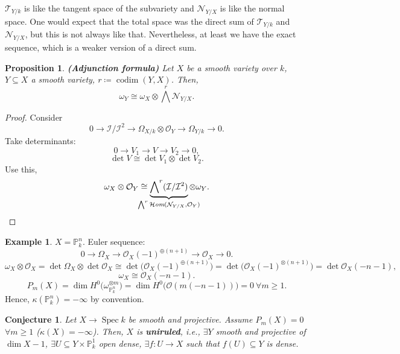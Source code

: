 \documentclass[12pt]{article}
\DeclareMathOperator{\Spec}{Spec}
\DeclareMathOperator{\shHom}{\mathcal H\textit{om}}
\DeclareMathOperator{\codim}{codim}
\newtheorem*{proposition}{Proposition}
\newtheorem*{conjecture}{Conjecture}
\theoremstyle{definition}
\newtheorem*{example}{Example}
\begin{document}
$\mathcal T_{Y/k}$ is like the tangent space of the subvariety and $\mathcal N_{Y/X}$ is like the normal space. One would expect that the total space was the direct sum of $\mathcal T_{Y/k}$ and $\mathcal N_{Y/X}$, but this is not always like that. Nevertheless, at least we have the exact sequence, which is a weaker version of a direct sum.

\begin{proposition}
\emph{\textbf{(Adjunction formula)}} Let $X$ be a smooth variety over $k$, $Y\subseteq X$ a smooth variety, $r\coloneqq\codim(Y,X)$. Then,
\[\omega_Y\cong\omega_X\otimes{\bigwedge}^r\mathcal N_{Y/X}.\]
\end{proposition}

\begin{proof}
Consider
\[0\longrightarrow\mathcal I/\mathcal I^2\longrightarrow\Omega_{X/k}\otimes\mathcal O_Y\longrightarrow\Omega_{Y/k}\longrightarrow0.\]
Take determinants:
\[0\longrightarrow V_1\longrightarrow V\longrightarrow V_2\longrightarrow0,\]
\[\det V\cong\det V_1\otimes\det V_2.\]
Use this,
\[\omega_X\otimes\mathcal O_Y\cong\underbrace{{\bigwedge}^r(\mathcal I/\mathcal I^2)}_{\mathclap{{\bigwedge}^r\shHom(\mathcal N_{Y/X},\mathcal O_Y)}}\otimes\omega_Y.\]
\end{proof}

\begin{example}
$X=\mathbb P_k^n$. Euler sequence:
\[0\longrightarrow\Omega_X\longrightarrow\mathcal O_X(-1)^{\oplus(n+1)}\longrightarrow\mathcal O_X\longrightarrow0.\]
\[\omega_X\otimes\mathcal O_X=\det\Omega_X\otimes\det\mathcal O_X\cong\det\big(\mathcal O_X(-1)^{\oplus(n+1)}\big)=\det\big(\mathcal O_X(-1)^{\otimes(n+1)}\big)=\det\mathcal O_X(-n-1),\]
\[\omega_X\cong\mathcal O_X(-n-1).\]
\[P_m(X)=\dim H^0\big(\omega_{\mathbb P_k^n}^{\otimes m}\big)=\dim H^0\big(\mathcal O(m(-n-1))\big)=0\ \forall m\geq1.\]
Hence, $\kappa(\mathbb P_k^n)=-\infty$ by convention.
\end{example}

\begin{conjecture}
Let $X\rightarrow\Spec k$ be smooth and projective. Assume $P_m(X)=0$ $\forall m\geq1$ ($\kappa(X)=-\infty$). Then, $X$ is \textbf{uniruled}, i.e., $\exists Y$ smooth and projective of $\dim X-1$, $\exists U\subseteq Y\times\mathbb P_k^1$ open dense, $\exists f:U\rightarrow X$ such that $f(U)\subseteq Y$ is dense.
\end{conjecture}
\end{document}
